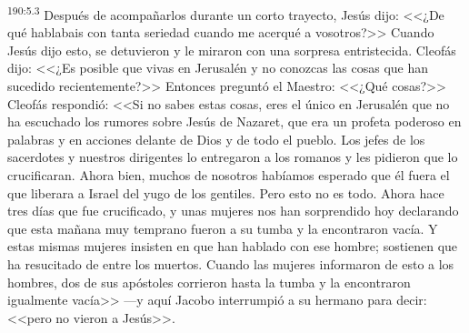 \par 
\textsuperscript{190:5.3} Después de acompañarlos durante un corto trayecto, Jesús dijo: <<¿De qué hablabais con tanta seriedad cuando me acerqué a vosotros?>> Cuando Jesús dijo esto, se detuvieron y le miraron con una sorpresa entristecida. Cleofás dijo: <<¿Es posible que vivas en Jerusalén y no conozcas las cosas que han sucedido recientemente?>> Entonces preguntó el Maestro: <<¿Qué cosas?>> Cleofás respondió: <<Si no sabes estas cosas, eres el único en Jerusalén que no ha escuchado los rumores sobre Jesús de Nazaret, que era un profeta poderoso en palabras y en acciones delante de Dios y de todo el pueblo. Los jefes de los sacerdotes y nuestros dirigentes lo entregaron a los romanos y les pidieron que lo crucificaran. Ahora bien, muchos de nosotros habíamos esperado que él fuera el que liberara a Israel del yugo de los gentiles. Pero esto no es todo. Ahora hace tres días que fue crucificado, y unas mujeres nos han sorprendido hoy declarando que esta mañana muy temprano fueron a su tumba y la encontraron vacía. Y estas mismas mujeres insisten en que han hablado con ese hombre; sostienen que ha resucitado de entre los muertos. Cuando las mujeres informaron de esto a los hombres, dos de sus apóstoles corrieron hasta la tumba y la encontraron igualmente vacía>> ---y aquí Jacobo interrumpió a su hermano para decir: <<pero no vieron a Jesús>>.

